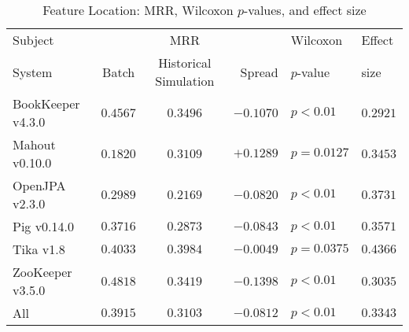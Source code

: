 \begin{table}[t]
\centering
\caption{Feature Location: MRR, Wilcoxon $p$-values, and effect size}
\begin{tabular}{l|ccr|ll}
\toprule
Subject & & MRR & & Wilcoxon & Effect \\
System  &  Batch & Historical Simulation & Spread & $p$-value & size \\
\midrule
BookKeeper v4.3.0 & $\bm{0.4567}$ & $0.3496$ & $-0.1070$ & $p < 0.01$ & $0.2921$ \\
Mahout v0.10.0 & $0.1820$ & $\bm{0.3109}$ & $+0.1289$ & $p = 0.0127$ & $0.3453$ \\
OpenJPA v2.3.0 & $\bm{0.2989}$ & $0.2169$ & $-0.0820$ & $p < 0.01$ & $0.3731$ \\
Pig v0.14.0 & $\bm{0.3716}$ & $0.2873$ & $-0.0843$ & $p < 0.01$ & $0.3571$ \\
Tika v1.8 & $\bm{0.4033}$ & $0.3984$ & $-0.0049$ & $p = 0.0375$ & $0.4366$ \\
ZooKeeper v3.5.0 & $\bm{0.4818}$ & $0.3419$ & $-0.1398$ & $p < 0.01$ & $0.3035$ \\
\midrule
All & $\bm{0.3915}$ & $0.3103$ & $-0.0812$ & $p < 0.01$ & $0.3343$ \\
\bottomrule
\end{tabular}
\label{table:feature_location_rq2}
\end{table}
